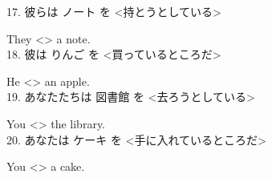 \documentclass[uplatex,
paper=a4,
fontsize=18pt,
jafontsize=16pt,
number_of_lines=30,
line_length=30zh,
baselineskip=25pt,
]{jlreq}
\begin{document}
17.  彼らは ノート を <持とうとしている>

  They <\hspace{3em}\hspace{3em}\hspace{2em}> a note.
\\

18.  彼は りんご を <買っているところだ>

  He <\hspace{3em}\hspace{3em}\hspace{2em}> an apple.
\\

19.  あなたたちは 図書館 を <去ろうとしている>

  You <\hspace{3em}\hspace{3em}\hspace{2em}> the library.
\\

20.  あなたは ケーキ を <手に入れているところだ>

  You <\hspace{3em}\hspace{3em}\hspace{2em}> a cake.
\\
\end{document}
